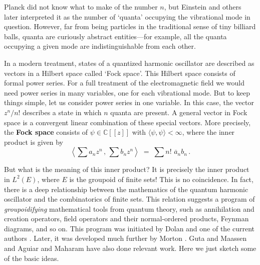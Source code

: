 \documentclass{article}
\newcommand{\C}{{\mathbb C}}
\begin{document}
Planck did not know what to make of the number $n$, but Einstein and
others later interpreted it as the number of `quanta' occupying the
vibrational mode in question.  However, far from being particles in
the traditional sense of tiny billiard balls, quanta are curiously
abstract entities---for example, all the quanta occupying a given
mode are indistinguishable from each other.

In a modern treatment, states of a quantized harmonic oscillator are
described as vectors in a Hilbert space called `Fock space'.  This
Hilbert space consists of formal power series.  For a full treatment 
of the electromagnetic field we would need power series in many 
variables, one for each vibrational mode.  But to keep things simple, 
let us consider power series in one variable.  In this case, the
vector $z^n/n!$ describes a state in which $n$ quanta are present.  
A general vector in Fock space is a convergent linear combination of
these special vectors.   More precisely, the {\bf Fock space} 
consists of $\psi \in \C[[z]]$ with $\langle \psi, \psi \rangle < 
\infty$, where the inner product is given by
\begin{equation}
\label{fock_inner_product} 
         \left\langle 
         \sum a_n z^n \, , \,
         \sum b_n z^n 
         \right\rangle 
\; = \;
\sum n! \,\,  \overline{a}_n b_n \, .
\end{equation}

But what is the meaning of this inner product?  It is precisely the
inner product in $L^2(E)$, where $E$ is the groupoid of finite sets!
This is no coincidence.  In fact, there is a deep relationship between
the mathematics of the quantum harmonic oscillator and the
combinatorics of finite sets.  This relation suggests a program of
{\it groupoidifying} mathematical tools from quantum theory, such as
annihilation and creation operators, field operators and their
normal-ordered products, Feynman diagrams, and so on.  This program
was initiated by Dolan and one of the current authors
\cite{BaezDolan:2001}.  Later, it was developed much further by Morton
\cite{Morton:2006}.  Guta and Maassen \cite{GM:2002} and Aguiar and
Maharam \cite{AM:2008} have also done relevant work.  Here we just
sketch some of the basic ideas.
\end{document}
